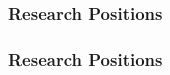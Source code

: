 \documentclass[aspectratio=169]{beamer}
\begin{document}
{
\begin{frame}
    \frametitle{Research Positions}
\end{frame}
}

{
\begin{frame}
    \frametitle{Research Positions}
\end{frame}
}
\end{document}
